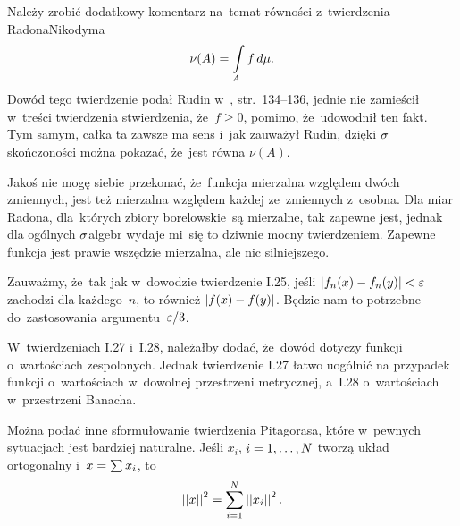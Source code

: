 \documentclass[a4paper,11pt]{article}
\begin{document}
\vspace{\spaceFour}


\start {} Należy zrobić dodatkowy komentarz na~temat równości
z~twierdzenia Radona\dywiz Nikodyma
\begin{equation}
  \label{eq:2}
  \nu( A ) = \int\limits_{  A  }  f  \, d \mu.
\end{equation}
Dowód tego twierdzenie podał Rudin w~\cite{Rudin98}, str.~134--136,
jednie nie zamieścił w~treści twierdzenia stwierdzenia, że~$f \geq 0$,
pomimo, że~udowodnił ten fakt. Tym samym, całka ta zawsze ma sens
i~jak zauważył Rudin, dzięki $\sigma$\dywiz skończoności można pokazać,
że~jest równa $\nu( A )$. %

\vspace{\spaceFour}


\start {} Jakoś nie mogę siebie przekonać, że~funkcja mierzalna
względem dwóch zmiennych, jest też mierzalna względem każdej
ze~zmiennych z~osobna. Dla miar Radona, dla~których zbiory
borelowskie~są mierzalne, tak zapewne jest, jednak dla ogólnych
$\sigma$\dywiz algebr wydaje mi~się to dziwnie mocny twierdzeniem.
Zapewne funkcja jest prawie wszędzie mierzalna, ale nic silniejszego.
\Dok

\vspace{\spaceFour}


\start {}  Zauważmy,
że~tak jak w~dowodzie twierdzenie I.25, jeśli
$\lvert  f_{ n }( x ) - f_{ n }( y )  \rvert < \varepsilon$ zachodzi dla
każdego~$n$, to również $\lvert  f( x ) - f( y )  \rvert$. Będzie nam to
potrzebne do~zastosowania argumentu~$\varepsilon / 3$. %

\vspace{\spaceFour}


\start {} W~twierdzeniach I.27 i~I.28, należałby dodać, że~dowód
dotyczy funkcji o~wartościach zespolonych. Jednak twierdzenie I.27
łatwo uogólnić na przypadek funkcji o~wartościach w~dowolnej
przestrzeni metrycznej, a~I.28 o~wartościach w~przestrzeni
Banacha. %

\vspace{\spaceFour}


\start {} Można podać inne sformułowanie twierdzenia Pitagorasa,
które w~pewnych sytuacjach jest bardziej naturalne. Jeśli $x_{ i }$,
$i = 1, \ldots, N$ tworzą układ ortogonalny i~$x = \sum\limits x_{ i }$, to
\begin{equation*}
  \left|\left|  x  \right|\right|^{ 2 } = \sum\limits_{ i = 1 }^{ N } \left|\left|  x_{ i }  \right|\right|^{ 2 }.
\end{equation*}
\end{document}
